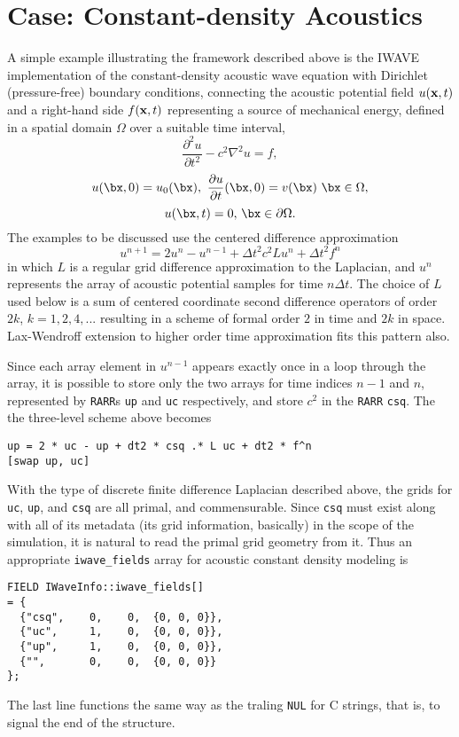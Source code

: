 \section{Case: Constant-density Acoustics}
A simple example illustrating the framework described above is the
IWAVE implementation of
the constant-density acoustic wave equation with Dirichlet
(pressure-free) boundary conditions, connecting the acoustic
potential field $u({\bf x},t)$ and a right-hand side $f({\bf x},t)$
representing a source of mechanical energy, defined in a spatial
domain $\Omega$ over a suitable time interval,
\[
\frac{\partial^2 u}{\partial t^2} - c^2 \nabla^2 u = f,
\]
\[
u(\bx,0) = u_0(\bx),\,\,\frac{\partial u}{\partial t}(\bx,0) =
v(\bx)\,\, \bx \in \Omega,
\]
\[
u(\bx,t) = 0, \,\bx \in \partial \Omega.
\]
The examples to be discussed use the centered
difference approximation \cite[]{kel76}
\[
u^{n+1} = 2 u^{n} - u^{n-1} + \Delta t^2 c^2 Lu^n + \Delta t^2 f^n
\]
in which $L$ is a regular grid difference approximation to the Laplacian, and $u^n$
represents the array of acoustic potential samples for time $n\Delta t$. The choice of $L$
used below is a sum of centered coordinate second difference
operators of order $2k$, $k=1, 2, 4,...$ resulting in a scheme of
formal order $2$ in time and $2k$ in space. Lax-Wendroff extension to
higher order time approximation fits this pattern also.

Since each array element in $u^{n-1}$ appears exactly once in a loop
through the array, it is possible to store only the two arrays for
time indices $n-1$ and $n$, represented by {\tt RARR}s {\tt up} and
{\tt uc} respectively, and store $c^2$ in the {\tt RARR} {\tt csq}.
The the three-level scheme above becomes
\begin{verbatim}
up = 2 * uc - up + dt2 * csq .* L uc + dt2 * f^n
[swap up, uc]
\end{verbatim}
With the type of discrete finite difference Laplacian described above,
the grids for {\tt uc}, {\tt up}, and {\tt csq} are all primal, and
commensurable. Since {\tt csq} must exist along with all of its
metadata (its grid information, basically) in the scope of the
simulation, it is natural to read the primal grid geometry from it.
Thus an appropriate {\tt iwave\_fields} array for acoustic constant
density modeling is
\begin{verbatim}
FIELD IWaveInfo::iwave_fields[]
= {
  {"csq",    0,    0,  {0, 0, 0}},
  {"uc",     1,    0,  {0, 0, 0}},
  {"up",     1,    0,  {0, 0, 0}},
  {"",       0,    0,  {0, 0, 0}}
};
\end{verbatim}
The last line functions the same way as the traling {\tt NUL} for C
strings, that is, to signal the end of the structure.

